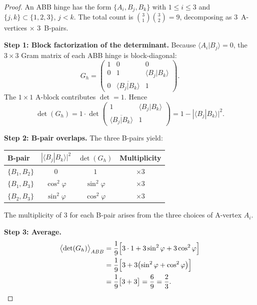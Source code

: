 \documentclass[12pt]{article}
\theoremstyle{remark}
\theoremstyle{definition}
\begin{document}
\begin{proof}
An ABB hinge has the form $\{A_i, B_j, B_k\}$ with $1 \leq i \leq 3$
and $\{j,k\} \subset \{1,2,3\}$, $j < k$.  The total count is
$\binom{3}{1}\binom{3}{2} = 9$, decomposing as $3$~A-vertices
$\times$ $3$~B-pairs.

\medskip\noindent\textbf{Step 1: Block factorization of the determinant.}
Because $\langle A_i | B_j \rangle = 0$, the $3 \times 3$ Gram matrix
of each ABB hinge is block-diagonal:
\begin{equation}
G_h = \begin{pmatrix} 1 & 0 & 0 \\ 0 & 1 & \langle B_j | B_k\rangle \\
0 & \overline{\langle B_j | B_k\rangle} & 1 \end{pmatrix}.
\end{equation}
The $1\times 1$ A-block contributes $\det = 1$.  Hence
\begin{equation}\label{eq:det_ABB_factor}
\det(G_h) = 1 \cdot \det\!\begin{pmatrix} 1 & \langle B_j|B_k\rangle \\
\overline{\langle B_j|B_k\rangle} & 1 \end{pmatrix}
= 1 - |\langle B_j | B_k \rangle|^2.
\end{equation}

\medskip\noindent\textbf{Step 2: B-pair overlaps.}
The three B-pairs yield:
\begin{center}
\begin{tabular}{lccc}
\toprule
B-pair & $|\langle B_j | B_k \rangle|^2$ & $\det(G_h)$ & Multiplicity \\
\midrule
$\{B_1, B_2\}$ & $0$ & $1$ & $\times 3$ \\
$\{B_1, B_3\}$ & $\cos^2\varphi$ & $\sin^2\varphi$ & $\times 3$ \\
$\{B_2, B_3\}$ & $\sin^2\varphi$ & $\cos^2\varphi$ & $\times 3$ \\
\bottomrule
\end{tabular}
\end{center}
The multiplicity of 3 for each B-pair arises from the three choices
of A-vertex $A_i$.

\medskip\noindent\textbf{Step 3: Average.}
\begin{align}
\bigl\langle \det(G_h) \bigr\rangle_{ABB}
&= \frac{1}{9}\Bigl[3 \cdot 1 + 3\sin^2\varphi + 3\cos^2\varphi\Bigr]
\notag\\
&= \frac{1}{9}\Bigl[3 + 3\bigl(\sin^2\varphi + \cos^2\varphi\bigr)\Bigr]
\notag\\
&= \frac{1}{9}\bigl[3 + 3\bigr]
= \frac{6}{9} = \frac{2}{3}. \qedhere
\end{align}
\end{proof}
\end{document}
